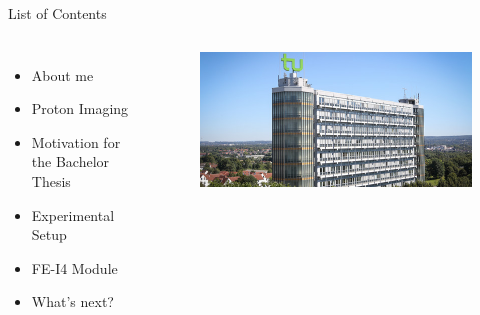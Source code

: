 


\maketitle
\begin{frame}{\huge{List of Contents}}
  \begin{columns}
      \begin{itemize}
        \setlength\itemsep{1em}
        \item About me
        \item Proton Imaging
        \item Motivation for the Bachelor Thesis
        \item Experimental Setup
        \item FE-I4 Module
        \item What's next?
      \end{itemize}
      \begin{figure}
        \centering
        \includegraphics[width=\textwidth]{figures/tu.jpg}
      \end{figure}
\end{columns}
\end{frame}

